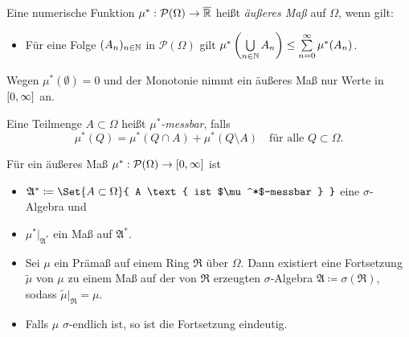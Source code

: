 \documentclass{cheat-sheet}
\newcommand{\Alg}{\mathfrak{A}} %
\newcommand{\Ring}{\mathfrak{R}} %
\begin{document}

\begin{defn}
  Eine numerische Funktion $\mu^* : \mathcal{P}(\Omega) \to \overline{\mathbb{R}}$ heißt \emph{äußeres Maß} auf $\Omega$, wenn gilt:
  \begin{itemize}
    \item Für eine Folge $(A_n)_{n \in \mathbb{N}}$ in $\mathcal{P}(\Omega)$ gilt $\mu^*\left(\bigcup_{n \in \N} A_n \right) \leq \sum_{n = 0}^\infty \mu^*(A_n)$. %
  \end{itemize}
\end{defn}

\begin{bem}
  Wegen $\mu^*(\emptyset) = 0$ und der Monotonie nimmt ein äußeres Maß nur Werte in $\left[ 0, \infty \right]$ an.
\end{bem}

\begin{defn}
  Eine Teilmenge $A \subset \Omega$ heißt \emph{$\mu^*$-messbar}, falls
  \[ \mu^*(Q) = \mu^*(Q \cap A) + \mu^*(Q \setminus A) \quad \text{für alle } Q \subset \Omega. \]
\end{defn}

\begin{satz}[Carathéodory]
  Für ein äußeres Maß $\mu^* : \mathcal{P}(\Omega) \to \left[ 0, \infty \right]$ ist
  \begin{itemize}
    \item $\Alg^* \coloneqq \Set{ A \subset \Omega }{ A \text{ ist $\mu^*$-messbar } }$ eine $\sigma$-Algebra und
    \item $\mu^*|_{\Alg^*}$ ein Maß auf $\Alg^*$.
  \end{itemize}
\end{satz}

\begin{satz}
  \begin{itemize}
    \item Sei $\mu$ ein Prämaß auf einem Ring $\Ring$ über $\Omega$. Dann existiert eine Fortsetzung $\widetilde{\mu}$ von $\mu$ zu einem Maß auf der von $\Ring$ erzeugten $\sigma$-Algebra $\Alg \coloneqq \sigma(\Ring)$, sodass $\widetilde{\mu}|_{\Ring} = \mu$.
    \item Falls $\mu$ $\sigma$-endlich ist, so ist die Fortsetzung eindeutig.
  \end{itemize}
\end{satz}
\end{document}
